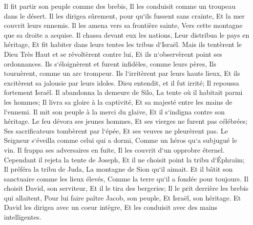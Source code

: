 \verse Il fit partir son peuple comme des brebis, Il les conduisit comme un troupeau dans le désert. 
\verse Il les dirigea sûrement, pour qu`ils fussent sans crainte, Et la mer couvrit leurs ennemis. 
\verse Il les amena vers sa frontière sainte, Vers cette montagne que sa droite a acquise. 
\verse Il chassa devant eux les nations, Leur distribua le pays en héritage, Et fit habiter dans leurs tentes les tribus d`Israël. 
\verse Mais ils tentèrent le Dieu Très Haut et se révoltèrent contre lui, Et ils n`observèrent point ses ordonnances. 
\verse Ils s`éloignèrent et furent infidèles, comme leurs pères, Ils tournèrent, comme un arc trompeur. 
\verse Ils l`irritèrent par leurs hauts lieux, Et ils excitèrent sa jalousie par leurs idoles. 
\verse Dieu entendit, et il fut irrité; Il repoussa fortement Israël. 
\verse Il abandonna la demeure de Silo, La tente où il habitait parmi les hommes; 
\verse Il livra sa gloire à la captivité, Et sa majesté entre les mains de l`ennemi. 
\verse Il mit son peuple à la merci du glaive, Et il s`indigna contre son héritage. 
\verse Le feu dévora ses jeunes hommes, Et ses vierges ne furent pas célébrées; 
\verse Ses sacrificateurs tombèrent par l`épée, Et ses veuves ne pleurèrent pas. 
\verse Le Seigneur s`éveilla comme celui qui a dormi, Comme un héros qu`a subjugué le vin. 
\verse Il frappa ses adversaires en fuite, Il les couvrit d`un opprobre éternel. 
\verse Cependant il rejeta la tente de Joseph, Et il ne choisit point la tribu d`Éphraïm; 
\verse Il préféra la tribu de Juda, La montagne de Sion qu`il aimait. 
\verse Et il bâtit son sanctuaire comme les lieux élevés, Comme la terre qu`il a fondée pour toujours. 
\verse Il choisit David, son serviteur, Et il le tira des bergeries; 
\verse Il le prit derrière les brebis qui allaitent, Pour lui faire paître Jacob, son peuple, Et Israël, son héritage. 
\verse Et David les dirigea avec un coeur intègre, Et les conduisit avec des mains intelligentes. 

\chapter{}

